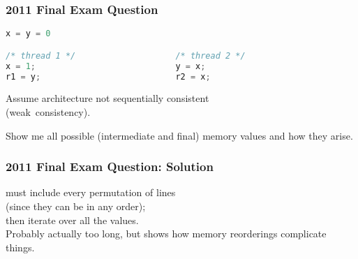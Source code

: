 \begin{frame}[fragile]
  \frametitle{2011 Final Exam Question}

  
  \begin{lstlisting}[language=C]
                       x = y = 0

/* thread 1 */                    /* thread 2 */
x = 1;                            y = x;
r1 = y;                           r2 = x;
  \end{lstlisting}

  Assume architecture not sequentially consistent\\ \hspace*{3em} (weak~consistency).

  Show me all possible (intermediate and final) memory values and how they arise.
  
\end{frame}

\begin{frame}[fragile]
  \frametitle{2011 Final Exam Question: Solution}

  
    must include every permutation of lines \\ \qquad (since they can be in
      any order);\\
    then iterate over all the values.\\[1em]

    Probably actually too long, but shows how memory reorderings
      complicate things.
  
\end{frame}

